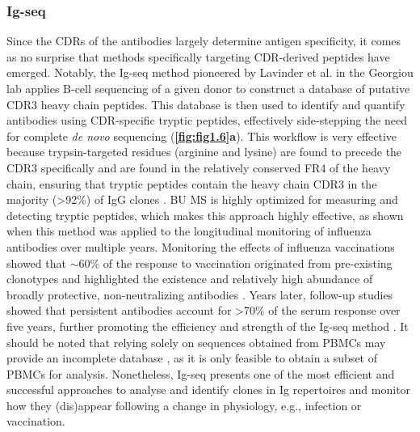 \subsubsection{Ig-seq}
Since the CDRs of the antibodies largely determine antigen specificity, it comes as no surprise that methods specifically targeting CDR-derived peptides have emerged. Notably, the Ig-seq method pioneered by Lavinder et al. \cite{lavinder2015next-generation} in the Georgiou lab applies B-cell sequencing of a given donor to construct a database of putative CDR3 heavy chain peptides. This database is then used to identify and quantify antibodies using CDR-specific tryptic peptides, effectively side-stepping the need for complete \emph{de novo} sequencing (\textbf{\autoref{fig:fig1.6}a}). This workflow is very effective because trypsin-targeted residues (arginine and lysine) are found to precede the CDR3 specifically and are found in the relatively conserved FR4 of the heavy chain, ensuring that tryptic peptides contain the heavy chain CDR3 in the majority (>92\%) of IgG clones \cite{lavinder2014identification}. BU MS is highly optimized for measuring and detecting tryptic peptides, which makes this approach highly effective, as shown when this method was applied to the longitudinal monitoring of influenza antibodies over multiple years. Monitoring the effects of influenza vaccinations showed that $\sim$60\% of the response to vaccination originated from pre-existing clonotypes and highlighted the existence and relatively high abundance of broadly protective, non-neutralizing antibodies \cite{lee2016molecular-level}. Years later, follow-up studies showed that persistent antibodies account for >70\% of the serum response over five years, further promoting the efficiency and strength of the Ig-seq method \cite{lee2019persistent}. It should be noted that relying solely on sequences obtained from PBMCs may provide an incomplete database \cite{guthals2017de}, as it is only feasible to obtain a subset of PBMCs for analysis. Nonetheless, Ig-seq presents one of the most efficient and successful approaches to analyse and identify clones in Ig repertoires and monitor how they (dis)appear following a change in physiology, e.g., infection or vaccination.
